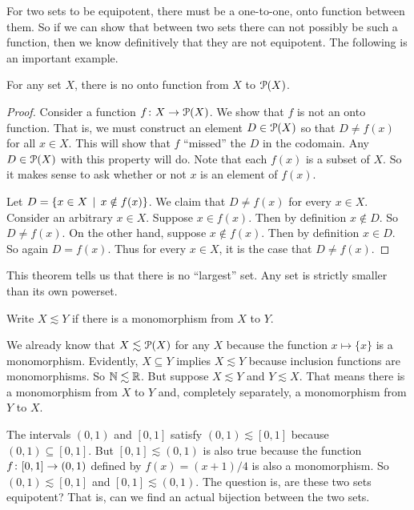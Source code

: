 For two sets to be equipotent, there must be a one-to-one, onto function between them. So if we can show that between two sets there can not possibly be such a function, then we know definitively that they are not equipotent. 
The following is an important example.

\begin{theorem}
	For any set $X$, there is no onto function from $X$ to ${\mathcal{P}}(X)$.
	
	\begin{proof}
		Consider a function ${f}\colon{X}\to{{\mathcal{P}}(X)}$. We show that $f$ is not an onto function. That is, we must construct an element $D\in{\mathcal{P}}(X)$ so that $D\neq f(x)$ for all $x\in X$. This will show that $f$ ``missed'' the $D$ in the codomain. Any $D\in{\mathcal{P}}(X)$ with this property will do. Note that each $f(x)$ is a subset of $X$. So it makes sense to ask whether or not $x$ is an element of  $f(x)$. 
		
		Let $D = \{x\in X\,\mid\, x\notin f(x)\}$. We claim that $D\neq f(x)$ for every $x\in X$. Consider an arbitrary $x\in X$. Suppose $x\in f(x)$. Then by definition $x\notin D$. So $D\neq f(x)$. On the other hand, suppose $x\notin f(x)$. Then by definition $x\in D$. So again $D=f(x)$. Thus for every $x\in X$, it is the case that $D\neq f(x)$.
	\end{proof}
\end{theorem}

This theorem tells us that there is no ``largest'' set. Any set is strictly smaller than its own powerset.

\begin{defn}
	Write $X\lesssim Y$ if there is a monomorphism from $X$ to $Y$. 
\end{defn}

We already know that $X\lesssim {\mathcal{P}}(X)$ for any $X$ because the function $x\mapsto \{x\}$ is a monomorphism. Evidently, $X\subseteq Y$ implies $X\lesssim Y$ because inclusion functions are monomorphisms. So $\mathbb N\lesssim\mathbb R$. But suppose $X\lesssim Y$ and $Y\lesssim X$. That means there is a monomorphism from $X$ to $Y$ and, completely separately, a monomorphism from $Y$ to $X$.

\begin{example}
	The intervals $(0,1)$ and $[0,1]$ satisfy $(0,1)\lesssim[0,1]$ because $(0,1)\subseteq [0,1]$. But $[0,1]\lesssim (0,1)$ is also true because the function ${f}\colon{[0,1]}\to{(0,1)}$ defined by $f(x) = (x+1)/4$ is also a monomorphism. So $(0,1)\lesssim[0,1]$ and $[0,1]\lesssim(0,1)$. The question is, are these two sets equipotent? That is, can we find an actual bijection between the two sets. 
\end{example}

